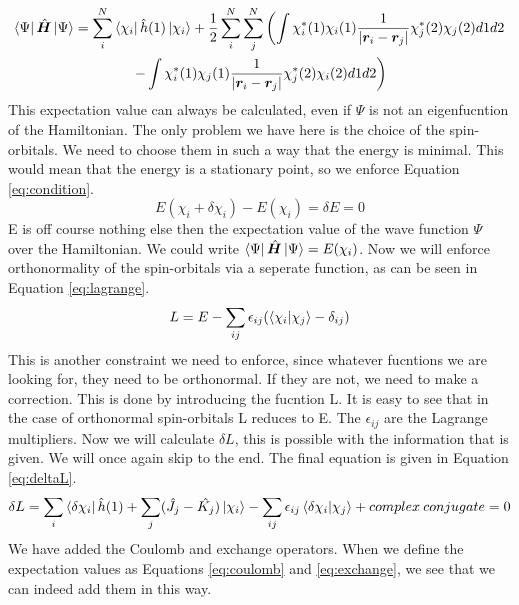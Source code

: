 \begin{multline}\label{eq:expect} 
    \bra{\Psi}\hat{\boldsymbol{H}}\ket{\Psi} = \sum_i^N\bra{\chi_i}\hat{h}(1)\ket{\chi_i} + \frac{1}{2}\sum_i^N\sum_j^N\left(\int\chi_i^*(1)\chi_i(1)\frac{1}{|\boldsymbol{r}_i- \boldsymbol{r}_j|}\chi_j^*(2)\chi_j(2)d1d2 \right.\\
     \left. - \int\chi_i^*(1)\chi_j(1)\frac{1}{|\boldsymbol{r}_i - \boldsymbol{r}_j|}\chi_j^*(2)\chi_i(2)d1d2\right)
\end{multline}
This expectation value can always be calculated, even if $\Psi$ is not an eigenfucntion
of the Hamiltonian. The only problem we have here is the choice of the spin-orbitals.
We need to choose them in such a way that the energy is minimal. This would mean
that the energy is a stationary point, so we enforce Equation \ref{eq:condition}.  
\begin{equation}\label{eq:condition}
    E(\chi_i + \delta\chi_i) - E(\chi_i) =\delta E = 0
\end{equation}
E is off course nothing else then the expectation value of the
wave function $\Psi$ over the Hamiltonian. We could write $\bra{\Psi}\hat{\boldsymbol{H}}\ket{\Psi} = E(\chi_i)$. 
Now we will enforce orthonormality of the spin-orbitals via a seperate function, as
can be seen in Equation \ref{eq:lagrange}.
\begin{equation}\label{eq:lagrange}
    L = E - \sum_{ij}\epsilon_{ij}(\braket{\chi_i}{\chi_j} - \delta_{ij})
\end{equation}
This is another constraint we need to enforce, since whatever fucntions we are 
looking for, they need to be orthonormal. If they are not, we need to make a correction.
This is done by introducing the fucntion L. It is easy to see that in the case of
orthonormal spin-orbitals L reduces to E. The $\epsilon_{ij}$ are the Lagrange 
multipliers. Now we will calculate $\delta L$, this is possible with the 
information that is given. We will once again skip to the end. The final equation 
is given in Equation \ref{eq:deltaL}.
\begin{equation}\label{eq:deltaL}
    \delta L = \sum_i\bra{\delta\chi_i}\hat{h}(1) + \sum_j(\hat{J_j} - \hat{K_j})\ket{\chi_i} -  \sum_{ij}\epsilon_{ij}\braket{\delta\chi_i}{\chi_j} + complex\:conjugate = 0
\end{equation}
We have added the Coulomb and exchange operators. When we define the expectation
values as Equations \ref{eq:coulomb} and \ref{eq:exchange}, we see that we can indeed
add them in this way.

